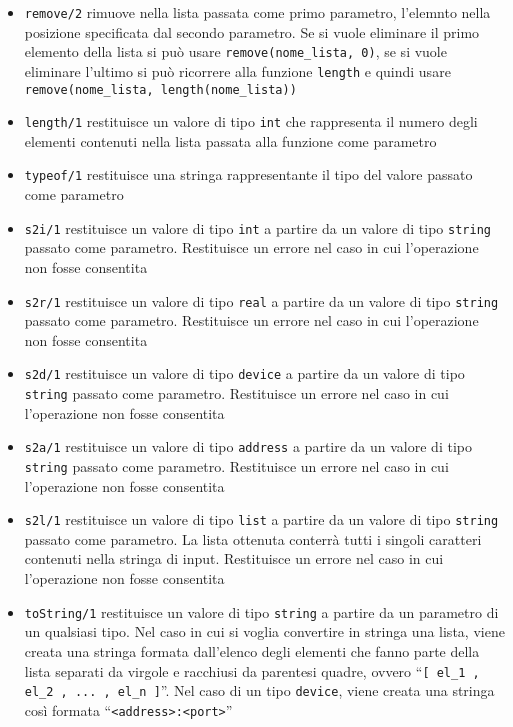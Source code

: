 \documentclass[10pt]{article}
\begin{document}
\begin{itemize}
\item \texttt{remove/2} rimuove nella lista passata come primo parametro, l'elemnto nella posizione specificata dal secondo parametro. Se si vuole eliminare il primo elemento della lista si può usare \texttt{remove(nome\_lista, 0)}, se si vuole eliminare l'ultimo si può ricorrere alla funzione \texttt{length} e quindi usare \texttt{remove(nome\_lista, length(nome\_lista))}
\item \texttt{length/1} restituisce un valore di tipo \texttt{int} che rappresenta il numero degli elementi contenuti nella lista passata alla funzione come parametro
\item \texttt{typeof/1} restituisce una stringa rappresentante il tipo del valore passato come parametro
\item \texttt{s2i/1} restituisce un valore di tipo \texttt{int} a partire da un valore di tipo \texttt{string} passato come parametro. Restituisce un errore nel caso in cui l'operazione non fosse consentita 
\item \texttt{s2r/1} restituisce un valore di tipo \texttt{real} a partire da un valore di tipo \texttt{string} passato come parametro. Restituisce un errore nel caso in cui l'operazione non fosse consentita 
\item \texttt{s2d/1} restituisce un valore di tipo \texttt{device} a partire da un valore di tipo \texttt{string} passato come parametro. Restituisce un errore nel caso in cui l'operazione non fosse consentita  
\item \texttt{s2a/1} restituisce un valore di tipo \texttt{address} a partire da un valore di tipo \texttt{string} passato come parametro. Restituisce un errore nel caso in cui l'operazione non fosse consentita 
\item \texttt{s2l/1} restituisce un valore di tipo \texttt{list} a partire da un valore di tipo \texttt{string} passato come parametro. La lista ottenuta conterrà tutti i singoli caratteri contenuti nella stringa di input. Restituisce un errore nel caso in cui l'operazione non fosse consentita
\item \texttt{toString/1} restituisce un valore di tipo \texttt{string} a partire da un parametro di un qualsiasi tipo. Nel caso in cui si voglia convertire in stringa una lista, viene creata una stringa formata dall'elenco degli elementi che fanno parte della lista separati da virgole e racchiusi da parentesi quadre, ovvero ``\texttt{[ el\_1 , el\_2 , ... , el\_n ]}''. Nel caso di un tipo \texttt{device}, viene creata una stringa così formata ``\texttt{<address>:<port>}'' 

\end{itemize}
\end{document}
